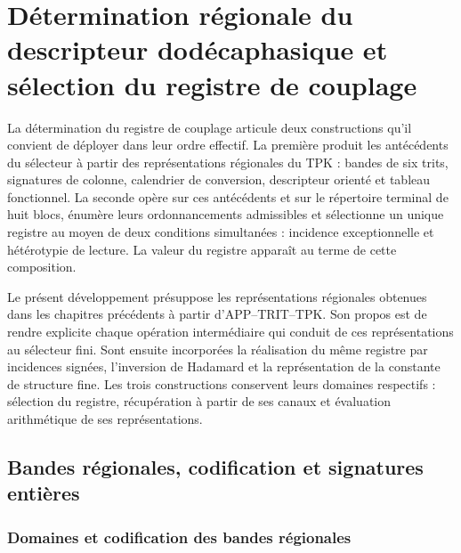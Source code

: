 \section{Détermination régionale du descripteur dodécaphasique et sélection du registre de couplage}
\label{act21:chap:despliegue-selector-k}

La détermination du registre de couplage articule deux constructions
qu'il convient de déployer dans leur ordre effectif. La première produit les
antécédents du sélecteur à partir des représentations régionales du TPK :
bandes de six trits, signatures de colonne, calendrier de conversion,
descripteur orienté et tableau fonctionnel. La seconde opère sur ces
antécédents et sur le répertoire terminal de huit blocs, énumère leurs
ordonnancements admissibles et sélectionne un unique registre au moyen de deux
conditions simultanées : incidence exceptionnelle et hétérotypie de lecture.
La valeur du registre apparaît au terme de cette composition.

Le présent développement présuppose les représentations régionales obtenues
dans les chapitres précédents à partir d'APP--TRIT--TPK. Son propos est de rendre
explicite chaque opération intermédiaire qui conduit de ces représentations
au sélecteur fini. Sont ensuite incorporées la réalisation du même
registre par incidences signées, l'inversion de Hadamard et la
représentation de la constante de structure fine. Les trois constructions
conservent leurs domaines respectifs : sélection du registre, récupération
à partir de ses canaux et évaluation arithmétique de ses représentations.

\subsection{Bandes régionales, codification et signatures entières}

\subsubsection{Domaines et codification des bandes régionales}

